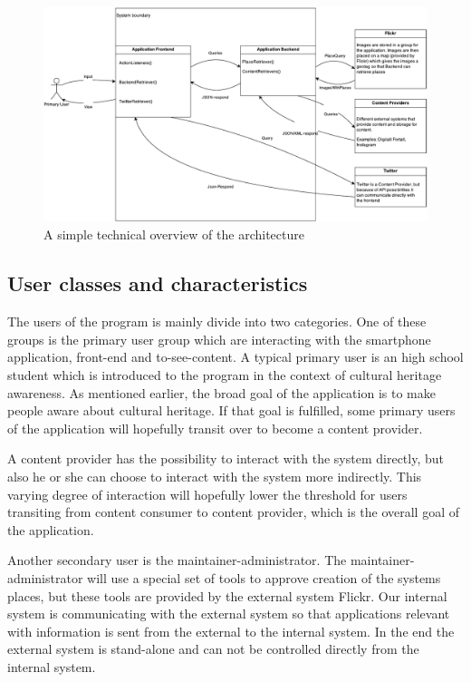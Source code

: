 \begin{figure}[h!]
\begin{center}
\includegraphics[scale=0.6]{tooverview-architecture}
\caption{A simple technical overview of the architecture}
\end{center}
\end{figure}

\subsection{User classes and characteristics}
The users of the program is mainly divide into two categories. One of these groups is the primary user group which are interacting with the smartphone application, front-end and to-see-content. A typical primary user is an high school student which is introduced to the program in the context of cultural heritage awareness. As mentioned earlier, the broad goal of the application is to make people aware about cultural heritage. If that goal is fulfilled, some primary users of the application will hopefully transit over to become a content provider. 

\noindent

A content provider has the possibility to interact with the system directly, but also he or she can choose to interact with the system more indirectly. This varying degree of interaction will hopefully lower the threshold for users transiting from content consumer to content provider, which is the overall goal of the application. 

\noindent

Another secondary user is the maintainer-administrator. The maintainer-administrator will use a special set of tools to approve creation of the systems places, but these tools are provided by the external system Flickr. Our internal system is communicating with the external system so that applications relevant with information is sent from the external to the internal system. In the end the external system is stand-alone and can not be controlled directly from the internal system. 


